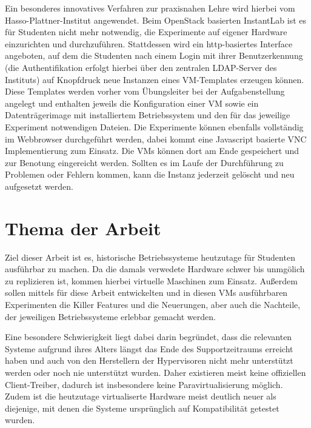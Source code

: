 		Ein besonderes innovatives Verfahren zur praxisnahen Lehre wird hierbei vom Hasso-Plattner-Institut angewendet.
		Beim OpenStack basierten InstantLab ist es für Studenten nicht mehr notwendig, die Experimente auf eigener Hardware einzurichten und durchzuführen.
		Stattdessen wird ein http-basiertes Interface angeboten, auf dem die Studenten nach einem Login mit ihrer Benutzerkennung (die Authentifikation erfolgt hierbei über den zentralen LDAP-Server des Instituts) auf Knopfdruck neue Instanzen eines VM-Templates erzeugen können. 
		Diese Templates werden vorher vom Übungsleiter bei der Aufgabenstellung angelegt und enthalten jeweils die Konfiguration einer VM sowie ein Datenträgerimage mit installiertem Betriebssystem und den für das jeweilige Experiment notwendigen Dateien.
		Die Experimente können ebenfalls vollständig im Webbrowser durchgeführt werden, dabei kommt eine Javascript basierte VNC Implementierung zum Einsatz.
		Die VMs können dort am Ende gespeichert und zur Benotung eingereicht werden.
		Sollten es im Laufe der Durchführung zu Problemen oder Fehlern kommen, kann die Instanz jederzeit gelöscht und neu aufgesetzt werden.

\section{Thema der Arbeit}
\label{sec:topic}
			


		Ziel dieser Arbeit ist es, historische Betriebssysteme heutzutage für Studenten ausführbar zu machen.
		Da die damals verwedete Hardware schwer bis unmgölich zu replizieren ist, kommen hierbei virtuelle Maschinen zum Einsatz.
		Außerdem sollen mittels für diese Arbeit entwickelten und in diesen VMs ausführbaren Experimenten die Killer Features und die Neuerungen, aber auch die Nachteile, der jeweiligen Betriebssysteme erlebbar gemacht werden.
		
		Eine besondere Schwierigkeit liegt dabei darin begründet, dass die relevanten Systeme aufgrund ihres Alters längst das Ende des Supportzeitraums erreicht haben und auch von den Herstellern der Hypervisoren nicht mehr unterstützt werden oder noch nie unterstützt wurden.
		Daher existieren meist keine offiziellen Client-Treiber, dadurch ist insbesondere keine Paravirtualisierung möglich.
		Zudem ist die heutzutage virtualiserte Hardware meist deutlich neuer als diejenige, mit denen die Systeme ursprünglich auf Kompatibilität getestet wurden.


